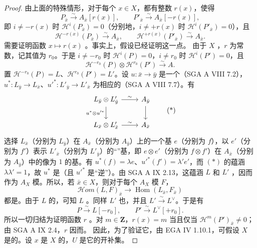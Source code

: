 \begin{proof}
由上面的特殊情形，对于每个 $x\in X$，都有整数 $r(x)$，使得
\[
 P_{\bar x}\xrightarrow{\sim}A_{\bar x}[r(x)],\qquad
 P'_{\bar x}\xrightarrow{\sim}A_{\bar x}[-r(x)],
\]
即 $i\ne-r(x)$ 时 $\mathcal H^i(P_{\bar x})=0$（分别地，$i\ne+r(x)$ 时 $\mathcal H^i(P'_{\bar x})=0$），且
\[
 \mathcal H^{-r(x)}(P_{\bar x})\xrightarrow{\sim}A_{\bar x},\qquad
 \mathcal H^{+r(x)}(P'_{\bar x})\xrightarrow{\sim}A_{\bar x}.
\]
需要证明函数 $x\longmapsto r(x)$ 。事实上，假设已经证明这一点。
由于 $X$ ，$r$ 为常数，记其值为 $r_0$。于是 $i\ne-r_0$ 时 $\mathcal H^i(P)=0$，$i\ne r_0$ 时 $\mathcal H^i(P')=0$，且
\[
 \mathcal H^{-r_0}(P)\otimes\mathcal H^{r_0}(P')\xrightarrow{\sim}A.
\]
置 $\mathcal H^{-r_0}(P)=L$、$\mathcal H^{r_0}(P')=L'$。设 $u:\bar x\longrightarrow\bar y$ 是一个（SGA A VIII 7.2），$u^*:L_{\bar y}\longrightarrow L_{\bar x}$、$u'^*:L'_{\bar y}\longrightarrow L'_{\bar x}$ 为相应的（SGA A VIII 7.7）。有
\[
\begin{tikzcd}
 L_{\bar y}\otimes L'_{\bar y}\arrow[r,"\sim"]\arrow[d,"u^*\otimes u'^*"'] & A_{\bar y}\arrow[d]\\
 L_{\bar x}\otimes L'_{\bar x}\arrow[r,"\sim"] & A_{\bar x}
\end{tikzcd}\tag{*}
\]
选择 $L_{\bar x}$（分别为 $L_{\bar y}$）在 $A_{\bar x}$（分别为 $A_{\bar y}$）上的一个基 $e$（分别为 $f$），以 $e'$（分别为 $f'$）表示 $L'_{\bar x}$（分别为 $L'_{\bar y}$）的“”基，即 $e\otimes e'$（分别为 $f\otimes f'$）在 $A_{\bar x}$（分别为 $A_{\bar y}$）中的像为 $1$ 的基。有 $u^*(f)=\lambda e$、$u'^*(f')=\lambda'e'$，而 $(*)$ 的蕴涵 $\lambda\lambda'=1$，故 $u^*$ 是（且 $u'^*$ 是“逆”）。由 SGA A IX 2.13，这蕴涵 $L$ 和 $L'$ ，因而作为 $A_X$ 模。所以，若 $\bar x\in X$，则对于每个 $A_X$ 模 $F$，
\[
 \mathcal Hom(L,F)_{\bar x}\longrightarrow\operatorname{Hom}(L_{\bar x},F_{\bar x})
\]
都是。由于 $L$ 的，可知 $L$ 。同样 $L'$ 也，并且 $L'\xrightarrow{\sim}L^\vee$。于是有
\[
 P\xrightarrow{\sim}L[-r_0],\qquad P'\xrightarrow{\sim}L^\vee[+r_0].
\]
所以一切归结为证明函数 $r$ 。对 $m\in\mathbf Z$，$r(x)=m$ 当且仅当 $\mathcal H^m(P')_{\bar x}\ne0$；由 SGA A IX 2.4，$r$ 因而。
因此，为了验证它，由 EGA IV 1.10.1，可假设 $X$ 是的。设 $x$ 是 $X$ 的，$U$ 是它的开补集。


\end{proof}
